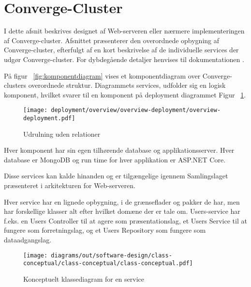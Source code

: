 \section{Converge-Cluster}

I dette afsnit beskrives designet af Web-serveren eller nærmere implementeringen af Converge-cluster. Afsnittet præsenterer den overordnede opbygning af Converge-cluster, efterfulgt af en kort beskrivelse af de individuelle services der udgør Converge-cluster. For dybdegående detaljer henvises til dokumentationen \cite[Converge-Cluster]{software-design}.

På figur ~\ref{fig:komponentdiagram} vises et komponentdiagram over Converge-clusters overordnede struktur. Diagrammets services, udfolder sig en logisk komponent, hvilket svarer til en komponent på deployment diagrammet Figur ~\ref{fig:deployment-without-relations}.

\begin{figure}[H]
  \begin{small}
    \begin{center}
      \texttt{[image: deployment/overview/overview-deployment/overview-deployment.pdf]}
    \end{center}
    \caption{Udrulning uden relationer}
    \label{fig:deployment-without-relations}
  \end{small}
\end{figure}

Hver komponent har sin egen tilhørende database og applikationsserver. Hver database er MongoDB og run time for hver applikation er ASP.NET Core.

Disse services kan kalde hinanden og er tilgængelige igennem Samlingslaget præsenteret i arkitekturen for Web-serveren.

Hver service har en lignede opbygning, i de grænseflader og pakker de har, men har forskellige klasser alt efter hvilket domæne der er tale om. Users-service har f.eks. en Users Controller til at agere som præsentationslag, et Users Service til at fungere som forretningslag, og et Users Repository som fungere som dataadgangslag.

\begin{figure}[H]
  \centering
\texttt{[image: diagrams/out/software-design/class-conceptual/class-conceptual/class-conceptual.pdf]}
\caption{Konceptuelt klassediagram for en service}
\label{fig:conceptual-class-service}
\end{figure}

